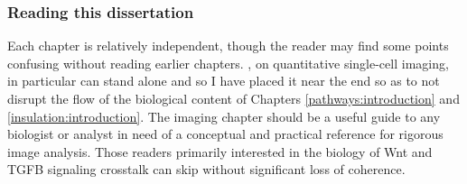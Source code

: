 \subsubsection{Reading this dissertation}


Each chapter is relatively independent, though
the reader may find some points confusing without reading earlier
chapters. , on quantitative single-cell imaging,
in particular can
stand alone and so I have placed it near the end so as to not disrupt
the flow of the biological content of Chapters \ref{pathways:introduction}
and \ref{insulation:introduction}.
The imaging chapter should be a useful guide to any biologist or analyst
in need of a conceptual and practical reference for rigorous image analysis.
Those readers primarily interested in the biology of Wnt and TGFB signaling
crosstalk can skip  without significant loss of coherence.

